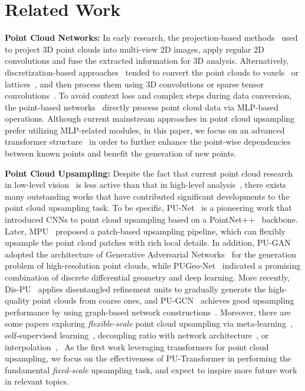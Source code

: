 \section{Related Work}
\label{sec:work}
\noindent \textbf{Point Cloud Networks:}
In early research, the projection-based methods~\cite{su2015multi,lawin2017deep} used to project 3D point clouds into multi-view 2D images, apply regular 2D convolutions and fuse the extracted information for 3D analysis. Alternatively, discretization-based approaches~\cite{guo2020deep} tended to convert the point clouds to voxels~\cite{huang2016point} or lattices~\cite{su2018splatnet}, and then process them using 3D convolutions or sparse tensor convolutions~\cite{choy20194d}. To avoid context loss and complex steps during data conversion, the point-based networks~\cite{qi2017pointnet,qi2017pointnet++,wang2019dynamic}  directly process point cloud data via MLP-based operations. Although current mainstream approaches in point cloud upsampling prefer utilizing MLP-related modules, in this paper, we focus on an advanced transformer structure~\cite{vaswani2017attention} in order to further enhance the point-wise dependencies between known points and benefit the generation of new points.

\noindent \textbf{Point Cloud Upsampling:}
Despite the fact that current point cloud research in low-level vision~\cite{yu2018pu,yuan2018pcn} is less active than that in high-level analysis~\cite{qi2017pointnet,hu2020randla,qi2019deep}, there exists many outstanding works that have contributed significant developments to the point cloud upsampling task. To be specific, PU-Net~\cite{yu2018pu} is a pioneering work that introduced CNNs to point cloud upsampling based on a PointNet++~\cite{qi2017pointnet++} backbone. Later, MPU~\cite{yifan2019patch} proposed a patch-based upsampling pipeline, which can flexibly upsample the point cloud patches with rich local details. In addition, PU-GAN~\cite{li2019pu} adopted the architecture of Generative Adversarial Networks~\cite{goodfellow2014generative} for the generation problem of high-resolution point clouds, while PUGeo-Net~\cite{qian2020pugeo} indicated a promising combination of discrete differential geometry and deep learning. More recently, Dis-PU~\cite{li2021point} applies disentangled refinement units to gradually generate the high-quality point clouds from coarse ones, and PU-GCN~\cite{qian2021pu} achieves good upsampling performance by using graph-based network constructions~\cite{wang2019dynamic}. Moreover, there are some papers exploring \emph{flexible-scale} point cloud upsampling via meta-learning~\cite{ye2021meta}, self-supervised learning~\cite{zhao2021sspu}, decoupling ratio with network architecture~\cite{luo2021pu}, or interpolation~\cite{qian2021deep}, \etc~As the first work leveraging transformers for point cloud upsampling, we focus on the effectiveness of PU-Transformer in performing the fundamental \emph{fixed-scale} upsampling task, and expect to inspire more future work in relevant topics. 

